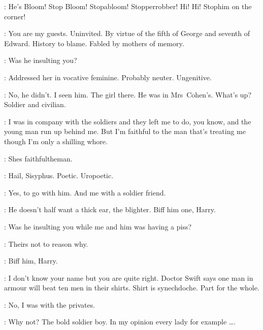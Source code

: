 \HueCry:
He's Bloom!
Stop Bloom!
Stopabloom!
Stopperrobber!
Hi! Hi!
Stophim on the corner!


\Stephen:
You are my guests.
Uninvited.
By virtue of the fifth of George and seventh of Edward.
History to blame.
Fabled by mothers of memory.

\Carr:
Was he insulting you?

\Stephen:
Addressed her in vocative feminine.
Probably neuter.
Ungenitive.

\Voices:
No, he didn't.
I seen him.
The girl there.
He was in Mrs~Cohen's.
What's up?
Soldier and civilian.

\Cissy:
I was in company with the soldiers and they left me
to do, you know, and the young man run up behind me.
But I'm faithful to the man that's treating me
though I'm only a shilling whore.

\Voices:
Shes faithfultheman.

\Stephen:
Hail, Sisyphus.
Poetic.
Uropoetic.

\Cissy:
Yes, to go with him.
And me with a soldier friend.

\Compton:
He doesn't half want a thick ear, the blighter.
Biff him one, Harry.

\Carr:
Was he insulting you while me and him was having a piss?

\LordTennyson:
Theirs not to reason why.

\Compton:
Biff him, Harry.

\Stephen:
I don't know your name but you are quite right.
Doctor Swift says one man in armour will beat ten men in their shirts.
Shirt is synechdoche.
Part for the whole.

\Cissy:
No, I was with the privates.

\Stephen:
Why not?
The bold soldier boy.
In my opinion every lady for example \ldots.

